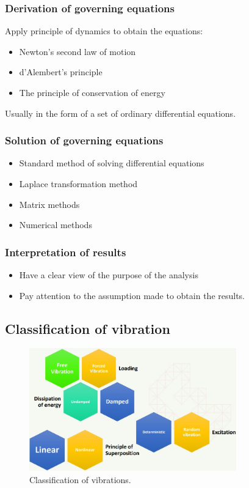 \subsubsection{Derivation of governing equations}
Apply principle of dynamics to obtain the equations:
\begin{itemize}
    \item Newton's second law of motion
    \item d'Alembert's principle
    \item The principle of conservation of energy
\end{itemize}
Usually in the form of a set of ordinary differential equations.
\subsubsection{Solution of governing equations}
\begin{itemize}
    \item Standard method of solving differential equations
    \item Laplace transformation method
    \item Matrix methods
    \item Numerical methods
\end{itemize}
\subsubsection{Interpretation of results}
\begin{itemize}
    \item Have a clear view of the purpose of the analysis
    \item Pay attention to the assumption made to obtain the results.
\end{itemize}
\subsection{Classification of vibration}
\begin{figure}[H]
    \centering
    \includegraphics[width = 0.8\textwidth]{./img/diagram10.jpg}
    \caption{Classification of vibrations.}
\end{figure}
